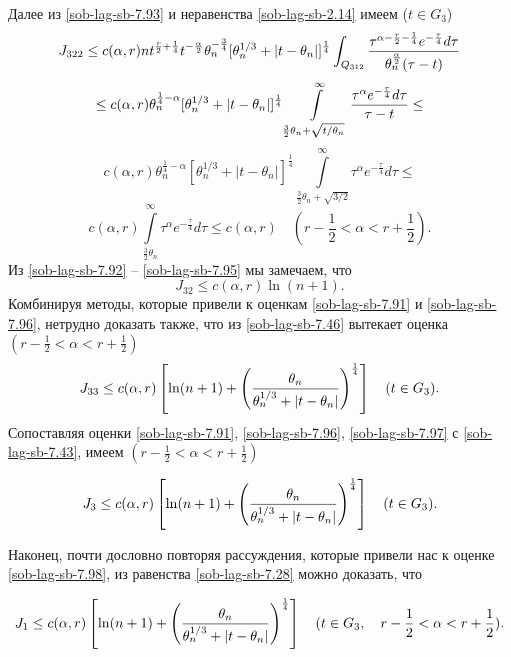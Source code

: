 Далее из \eqref{sob-lag-sb-7.93} и неравенства  \eqref{sob-lag-sb-2.14} имеем ($t\in G_3$)
$$
J_{322}\le c(\alpha,r)nt^{\frac{r}{2}+\frac14}t^{-\frac\alpha2}\theta_n^{-\frac34}[\theta_n^{1/3}+|t-\theta_n|]^\frac14
\int_{Q_{312}}{\tau^{\alpha-\frac{r}{2}-\frac14}e^{-\frac\tau4}d\tau\over\theta_n^{\frac{\alpha}2} (\tau-t)}
$$
$$
 \le c(\alpha,r)\theta_n^{\frac14-\alpha}[\theta_n^{1/3}+
 |t-\theta_n|]^\frac14\int\limits_{\frac{3}{2}\theta_n+\sqrt{t/\theta_n}}^\infty
 {\tau^{\alpha}e^{-\frac\tau4}d\tau\over \tau-t}\le
 $$
  $$
  c(\alpha,r)\theta_n^{\frac14-\alpha}[\theta_n^{1/3}+
 |t-\theta_n|]^\frac14\int\limits_{\frac{3}{2}\theta_n+\sqrt{3/2}}^\infty
 \tau^{\alpha}e^{-\frac\tau4}d\tau\le
 $$
 \begin{equation}\label{sob-lag-sb-7.95}
  c(\alpha,r) \int\limits_{\frac{3}{2}\theta_n}^\infty
 \tau^{\alpha}e^{-\frac\tau4}d\tau   \le c(\alpha,r)\quad (r-\frac12<\alpha<r+\frac12).
 \end{equation}
 Из \eqref{sob-lag-sb-7.92} -- \eqref{sob-lag-sb-7.95} мы замечаем, что
\begin{equation}\label{sob-lag-sb-7.96}
J_{32}\le c(\alpha,r)\ln(n+1).
\end{equation}
Комбинируя методы, которые привели к оценкам \eqref{sob-lag-sb-7.91} и  \eqref{sob-lag-sb-7.96},  нетрудно доказать также, что из \eqref{sob-lag-sb-7.46} вытекает оценка $(r-\frac12<\alpha<r+\frac12)$
\begin{equation}\label{sob-lag-sb-7.97}
J_{33}\le c(\alpha,r)\left[\ln(n+1)+\left({\theta_n\over\theta_n^{1/3}+|t-\theta_n|}\right)^\frac14\right]\quad (t\in G_3).
\end{equation}
Сопоставляя оценки \eqref{sob-lag-sb-7.91}, \eqref{sob-lag-sb-7.96}, \eqref{sob-lag-sb-7.97} с \eqref{sob-lag-sb-7.43}, имеем $(r-\frac12<\alpha<r+\frac12)$

\begin{equation}\label{sob-lag-sb-7.98}
J_{3}\le c(\alpha,r)\left[\ln(n+1)+\left({\theta_n\over\theta_n^{1/3}+|t-\theta_n|}\right)^\frac14\right]\quad (t\in G_3).
\end{equation}

Наконец, почти дословно повторяя рассуждения, которые привели нас к оценке \eqref{sob-lag-sb-7.98}, из равенства \eqref{sob-lag-sb-7.28} можно доказать, что

\begin{equation}\label{sob-lag-sb-7.99}
J_{1}\le c(\alpha,r)\left[\ln(n+1)+\left({\theta_n\over\theta_n^{1/3}+|t-\theta_n|}\right)^\frac14\right]\quad (t\in G_3, \quad r-\frac12<\alpha<r+\frac12).
\end{equation}

